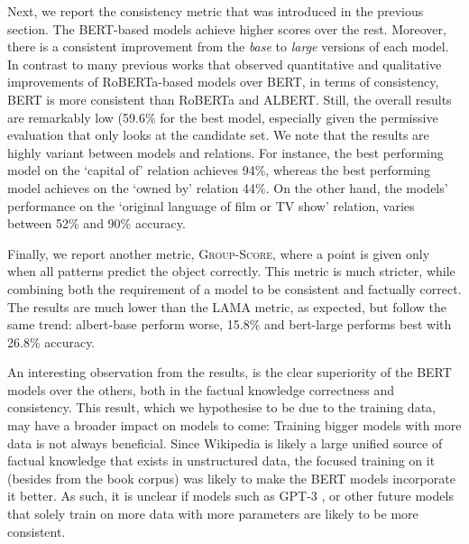 Next, we report the consistency metric that was introduced in the previous section.
The BERT-based models achieve higher scores over the rest. Moreover, there is a consistent improvement from the \textit{base} to \textit{large} versions of each model.
In contrast to many previous works that observed quantitative and qualitative improvements of RoBERTa-based models over BERT, in terms of consistency, BERT is more consistent than RoBERTa and ALBERT.
Still, the overall results are remarkably low (59.6\% for the best model, %
especially given the permissive evaluation that only looks at the candidate set.
We note that the results are highly variant between models and relations. For instance, the best performing model on the `capital of' relation achieves 94\%, whereas the best performing model achieves on the `owned by' relation 44\%. 
On the other hand, the models' performance on the `original language of film or TV show' relation, varies between 52\% and 90\% accuracy.

Finally, we report another metric, \textsc{Group-Score}, where a point is given only when all patterns predict the object correctly. This metric is much stricter, while combining both the requirement of a model to be consistent and factually correct. 
The results are much lower than the LAMA metric, as expected, but follow the same trend: albert-base perform worse, 15.8\% and bert-large performs best with 26.8\% accuracy.







An interesting observation from the results, is the clear superiority of the BERT models over the others, both in the factual knowledge correctness and consistency. This result, which we hypothesise to be due to the training data, may have a broader impact on models to come: Training bigger models with more data is not always beneficial. Since Wikipedia is likely a large unified source of factual knowledge that exists in unstructured data, the focused training on it (besides from the book corpus) was likely to make the BERT models incorporate it better.
As such, it is unclear if models such as GPT-3 \cite{gpt3}, or other future models that solely train on more data with more parameters are likely to be more consistent.




